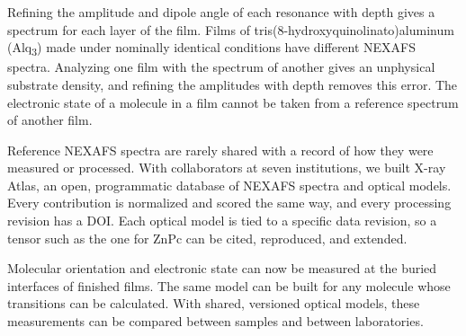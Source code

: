 Refining the amplitude and dipole angle of each resonance with depth gives a spectrum for each layer of the film. Films of tris(8-hydroxyquinolinato)aluminum (Alq\textsubscript{3}) made under nominally identical conditions have different NEXAFS spectra. Analyzing one film with the spectrum of another gives an unphysical substrate density, and refining the amplitudes with depth removes this error. The electronic state of a molecule in a film cannot be taken from a reference spectrum of another film.

Reference NEXAFS spectra are rarely shared with a record of how they were measured or processed. With collaborators at seven institutions, we built X-ray Atlas, an open, programmatic database of NEXAFS spectra and optical models. Every contribution is normalized and scored the same way, and every processing revision has a DOI. Each optical model is tied to a specific data revision, so a tensor such as the one for ZnPc can be cited, reproduced, and extended.

Molecular orientation and electronic state can now be measured at the buried interfaces of finished films. The same model can be built for any molecule whose transitions can be calculated. With shared, versioned optical models, these measurements can be compared between samples and between laboratories.
\clearpage

